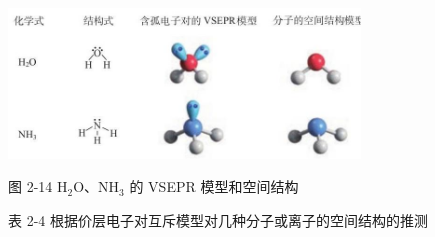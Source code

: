 \documentclass[10pt]{article}
\begin{document}
\begin{center}
\includegraphics[max width=0.7\textwidth]{images/0190e026-5a11-7df7-bd27-54d09026ba7a_49_788918.jpg}
\end{center}

图 2-14 \({\mathrm{H}}_{2}\mathrm{O}\text{、}{\mathrm{{NH}}}_{3}\) 的 VSEPR 模型和空间结构

表 2-4 根据价层电子对互斥模型对几种分子或离子的空间结构的推测
\end{document}

